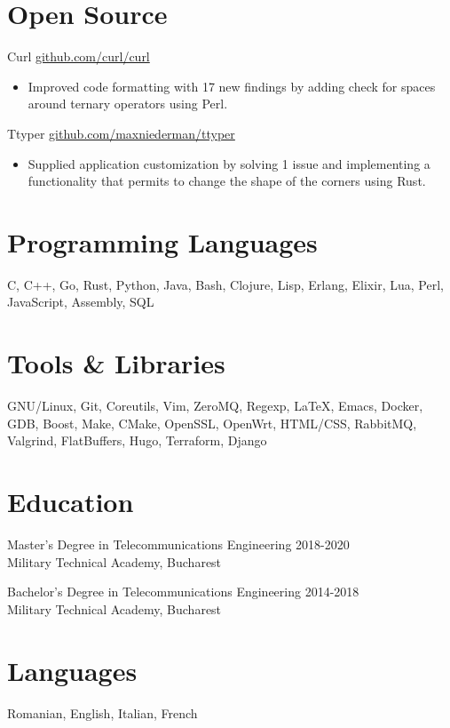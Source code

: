 \documentclass[a4paper,12pt]{article}
\begin{document}
\section{Open Source}
Curl \hfill \href{https://github.com/curl/curl}{github.com/curl/curl}
\vspace{-3mm}
\begin{itemize}[noitemsep, leftmargin=4mm]
\item Improved code formatting with 17 new findings by adding check for spaces around ternary operators using Perl.
\end{itemize}

Ttyper \hfill \href{https://github.com/maxniederman/ttype}{github.com/maxniederman/ttyper}
\vspace{-3mm}
\begin{itemize}[noitemsep, leftmargin=4mm]
\item Supplied application customization by solving 1 issue and implementing a functionality that permits to change the shape of the corners using Rust.
\end{itemize}

  
\section{Programming Languages}
C, C++, Go, Rust, Python, Java, Bash, Clojure, Lisp,
Erlang, Elixir, Lua, Perl, JavaScript, Assembly, SQL

\section{Tools \& Libraries}
GNU/Linux, Git, Coreutils, Vim, ZeroMQ, Regexp, \LaTeX, 
Emacs, Docker, GDB, Boost, Make, CMake, OpenSSL, OpenWrt, HTML/CSS, 
RabbitMQ, Valgrind, FlatBuffers, Hugo, Terraform, Django 

\section{Education}
Master's Degree in Telecommunications Engineering \hfill 2018-2020\\
Military Technical Academy, Bucharest

Bachelor's Degree in Telecommunications Engineering \hfill 2014-2018\\
Military Technical Academy, Bucharest

\section{Languages}
Romanian, English, Italian, French
\end{document}
